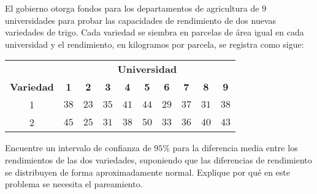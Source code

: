 \begin{enunciado}
 El gobierno otorga fondos para los departamentos de agricultura de $9$ universidades para probar las capacidades de rendimiento de dos nuevas variedades de trigo. Cada variedad se siembra en parcelas de \'area igual en cada universidad y el rendimiento, en kilogramos por parcela, se registra como sigue:
 \begin{center}
  \begin{tabular}{cccccccccc}
   & \multicolumn{9}{c}{\textbf{Universidad}} \\
   \cline{2-10}
   \textbf{Variedad} & \textbf{1} & \textbf{2} & \textbf{3} & \textbf{4} & \textbf{5} & \textbf{6} & \textbf{7} & \textbf{8} & \textbf{9} \\
   \hline 
   1 & $38$ & $23$ & $35$ & $41$ & $44$ & $29$ & $37$ & $31$ & $38$ \\
   2 & $45$ & $25$ & $31$ & $38$ & $50$ & $33$ & $36$ & $40$ & $43$
  \end{tabular}
 \end{center}
 Encuentre un intervalo de confianza de $95\%$ para la diferencia media entre los rendimientos de las dos variedades, suponiendo que las diferencias de rendimiento se distribuyen de forma aproximadamente normal. Explique por qu\'e en este problema se necesita el pareamiento.
\end{enunciado}

